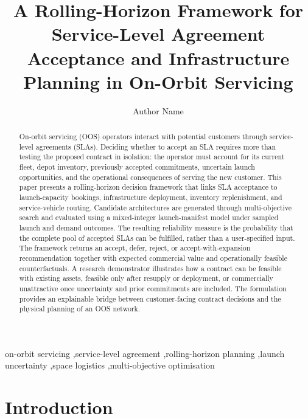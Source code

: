 \documentclass[review,12pt,authoryear]{elsarticle}
\begin{document}
\begin{frontmatter}

\title{A Rolling-Horizon Framework for Service-Level Agreement Acceptance and
Infrastructure Planning in On-Orbit Servicing}

\author[inst1]{Author Name}
\address[inst1]{Institution, Department, City, Country}

\begin{abstract}
On-orbit servicing (OOS) operators interact with potential customers through
service-level agreements (SLAs). Deciding whether to accept an SLA requires
more than testing the proposed contract in isolation: the operator must account
for its current fleet, depot inventory, previously accepted commitments,
uncertain launch opportunities, and the operational consequences of serving the
new customer. This paper presents a rolling-horizon decision framework that
links SLA acceptance to launch-capacity bookings, infrastructure deployment,
inventory replenishment, and service-vehicle routing. Candidate architectures
are generated through multi-objective search and evaluated using a
mixed-integer launch-manifest model under sampled launch and demand outcomes.
The resulting reliability measure is the probability that the complete pool of
accepted SLAs can be fulfilled, rather than a user-specified input. The
framework returns an accept, defer, reject, or accept-with-expansion
recommendation together with expected commercial value and operationally
feasible counterfactuals. A research demonstrator illustrates how a contract
can be feasible with existing assets, feasible only after resupply or
deployment, or commercially unattractive once uncertainty and prior
commitments are included. The formulation provides an explainable bridge
between customer-facing contract decisions and the physical planning of an OOS
network.
\end{abstract}

\begin{keyword}
on-orbit servicing \sep service-level agreement \sep rolling-horizon planning
\sep launch uncertainty \sep space logistics \sep multi-objective optimisation
\end{keyword}
\end{frontmatter}

\section{Introduction}
\label{sec:introduction}
\end{document}
